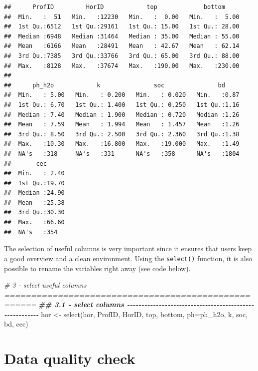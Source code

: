 \documentclass[
  10pt,
  b5paper,
  oneside]{book}
\newenvironment{Shaded}{\begin{snugshade}}{\end{snugshade}}
\newcommand{\AttributeTok}[1]{\textcolor[rgb]{0.77,0.63,0.00}{#1}}
\newcommand{\CommentTok}[1]{\textcolor[rgb]{0.56,0.35,0.01}{\textit{#1}}}
\newcommand{\DocumentationTok}[1]{\textcolor[rgb]{0.56,0.35,0.01}{\textbf{\textit{#1}}}}
\newcommand{\FunctionTok}[1]{\textcolor[rgb]{0.00,0.00,0.00}{#1}}
\newcommand{\NormalTok}[1]{#1}
\newcommand{\OtherTok}[1]{\textcolor[rgb]{0.56,0.35,0.01}{#1}}
\begin{document}
\begin{verbatim}
##      ProfID         HorID            top             bottom      
##  Min.   :  51   Min.   :12230   Min.   :  0.00   Min.   :  5.00  
##  1st Qu.:6512   1st Qu.:29161   1st Qu.: 15.00   1st Qu.: 28.00  
##  Median :6948   Median :31464   Median : 35.00   Median : 55.00  
##  Mean   :6166   Mean   :28491   Mean   : 42.67   Mean   : 62.14  
##  3rd Qu.:7385   3rd Qu.:33766   3rd Qu.: 65.00   3rd Qu.: 88.00  
##  Max.   :8128   Max.   :37674   Max.   :190.00   Max.   :230.00  
##                                                                  
##      ph_h2o            k               soc               bd      
##  Min.   : 5.00   Min.   : 0.200   Min.   : 0.020   Min.   :0.87  
##  1st Qu.: 6.70   1st Qu.: 1.400   1st Qu.: 0.250   1st Qu.:1.16  
##  Median : 7.40   Median : 1.900   Median : 0.720   Median :1.26  
##  Mean   : 7.59   Mean   : 1.994   Mean   : 1.457   Mean   :1.26  
##  3rd Qu.: 8.50   3rd Qu.: 2.500   3rd Qu.: 2.360   3rd Qu.:1.38  
##  Max.   :10.30   Max.   :16.800   Max.   :19.000   Max.   :1.49  
##  NA's   :318     NA's   :331      NA's   :358      NA's   :1804  
##       cec       
##  Min.   : 2.40  
##  1st Qu.:19.70  
##  Median :24.90  
##  Mean   :25.38  
##  3rd Qu.:30.30  
##  Max.   :66.60  
##  NA's   :354
\end{verbatim}

The selection of useful columns is very important since it ensures that users keep a good overview and a clean environment. Using the \texttt{select()} function, it is also possible to rename the variables right away (see code below).

\begin{Shaded}
\begin{Highlighting}[]
\CommentTok{\# 3 {-} select useful columns ====================================================}
\DocumentationTok{\#\# 3.1 {-} select columns {-}{-}{-}{-}{-}{-}{-}{-}{-}{-}{-}{-}{-}{-}{-}{-}{-}{-}{-}{-}{-}{-}{-}{-}{-}{-}{-}{-}{-}{-}{-}{-}{-}{-}{-}{-}{-}{-}{-}{-}{-}{-}{-}{-}{-}{-}{-}{-}{-}{-}{-}{-}{-}{-}{-}{-}}
\NormalTok{hor }\OtherTok{\textless{}{-}} \FunctionTok{select}\NormalTok{(hor, ProfID, HorID, top, bottom, }\AttributeTok{ph=}\NormalTok{ph\_h2o, k, soc, bd, cec)}
\end{Highlighting}
\end{Shaded}

\hypertarget{data-quality-check}{%
\section{Data quality check}\label{data-quality-check}}
\end{document}
